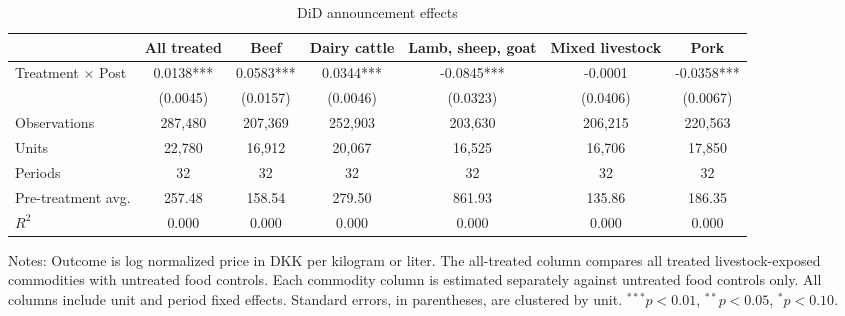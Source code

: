 \begin{table}[htbp]
\centering
\caption{DiD announcement effects}
\label{tab:did}
\footnotesize
\setlength{\tabcolsep}{3pt}
\begin{tabular}{lcccccc}
\hline\hline
 & All treated & Beef & Dairy cattle & Lamb, sheep, goat & Mixed livestock & Pork \\
\hline
Treatment $\times$ Post & 0.0138*** & 0.0583*** & 0.0344*** & -0.0845*** & -0.0001 & -0.0358*** \\
 & (0.0045) & (0.0157) & (0.0046) & (0.0323) & (0.0406) & (0.0067) \\
\hline
Observations & 287,480 & 207,369 & 252,903 & 203,630 & 206,215 & 220,563 \\
Units & 22,780 & 16,912 & 20,067 & 16,525 & 16,706 & 17,850 \\
Periods & 32 & 32 & 32 & 32 & 32 & 32 \\
Pre-treatment avg. & 257.48 & 158.54 & 279.50 & 861.93 & 135.86 & 186.35 \\
$R^2$ & 0.000 & 0.000 & 0.000 & 0.000 & 0.000 & 0.000 \\
\hline\hline
\end{tabular}
\begin{minipage}{0.96\linewidth}\footnotesize Notes: Outcome is log normalized price in DKK per kilogram or liter. The all-treated column compares all treated livestock-exposed commodities with untreated food controls. Each commodity column is estimated separately against untreated food controls only. All columns include unit and period fixed effects. Standard errors, in parentheses, are clustered by unit. $^{***}p<0.01$, $^{**}p<0.05$, $^{*}p<0.10$.\end{minipage}
\end{table}